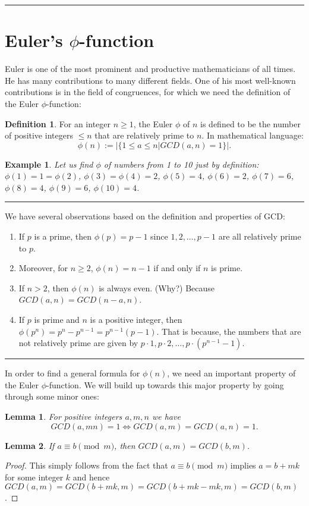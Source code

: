 \documentclass[12pt]{article}
\theoremstyle{plain}
\newtheorem{lemma}{Lemma}
\newtheorem{example}{Example}
\theoremstyle{definition}
\newtheorem{definition}{Definition}
\theoremstyle{remark}
\begin{document}
\bigskip
\hrule

\section{Euler's $\phi$-function}
Euler is one of the most prominent and productive mathematicians of all times. He has many contributions to many different fields. One of his most well-known contributions is in the field of congruences, for which we need the definition of the Euler $\phi$-function:
\begin{definition}
For an integer $n\geq 1$, the Euler $\phi$ of $n$ is defined to be the number of positive integers $\leq n$ that are relatively prime to $n$. In mathematical language:
$$\phi(n):= |\{1\leq a \leq n| GCD(a,n)=1\}|.$$
\end{definition}
\begin{example}
Let us find $\phi$ of numbers from 1 to 10 just by definition:
$\phi(1)=1=\phi(2)$, $\phi(3)=\phi(4)=2$, $\phi(5)=4$, $\phi(6)=2$, $\phi(7)=6$, $\phi(8)=4$, $\phi(9)=6$, $\phi(10)=4$.
\end{example}
\hrule

\bigskip
\noindent
We have several observations based on the definition and properties of GCD:
\begin{enumerate}
    \item If $p$ is a prime, then $\phi(p) = p-1$ since $1,2, \dots, p-1$ are all relatively prime to $p$.
 \item Moreover, for $n\geq 2$, $\phi(n) = n-1$ if and only if $n$ is prime.
 \item If $n>2$, then $\phi(n)$ is always even. (Why?)
 Because $GCD(a,n)=GCD(n-a,n)$.
 \item If $p$ is prime and $n$ is a positive integer, then
 $\phi(p^n)=p^n-p^{n-1} = p^{n-1}(p-1)$. That is because, the numbers that are not relatively prime are given by $p\cdot 1, p\cdot 2, \dots, p\cdot (p^{n-1}-1)$.
\end{enumerate}
\hrule

\bigskip
\noindent
In order to find a general formula for $\phi(n)$, we need an important property of the Euler $\phi$-function. We will build up towards this major property by going through some minor ones:
\begin{lemma}
For positive integers $a, m, n$ we have
$$GCD(a,mn)=1 \Leftrightarrow GCD(a,m)=GCD(a,n)=1.$$
\end{lemma}

\bigskip
\noindent
\begin{lemma}
If $a\equiv b \pmod{m}$, then $GCD(a,m)=GCD(b,m)$.
\end{lemma}
\begin{proof}
This simply follows from the fact that $a\equiv b \pmod{m}$ implies $a=b+mk$ for some integer $k$ and hence
$GCD(a,m) = GCD(b+mk,m) = GCD(b+mk-mk,m) = GCD(b,m)$.
\end{proof}
\end{document}

